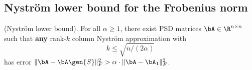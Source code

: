 

\subsection{Nystr\"om lower bound for the Frobenius norm}
\label{sec:nystrom-lb}
\begin{theorem}
    \label{thm:nystrom-frobenius-lb}
    (Nystr\"om lower bound). For all $\alpha \geq 1$, there exist PSD matrices $\bA\in\R^{n\times n}$ such that \textbf{any} rank-$k$ column Nystr\"om approximation with 
    \[ k \leq \sqrt{n/(2\alpha)}\]
    has error $\|\bA - \bA\gen{S}\|^2_F > \alpha\cdot \|\bA - \bA_1\|^2_F$.
\end{theorem}


